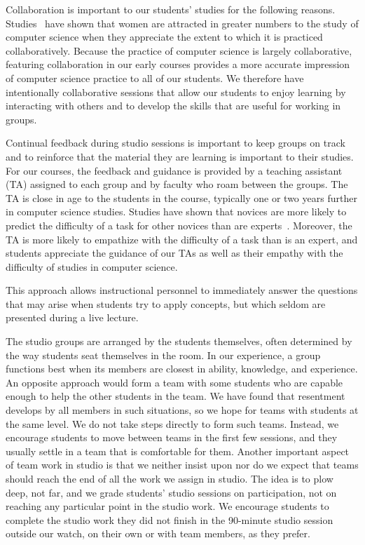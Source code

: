 Collaboration is important to our students' studies for the following reasons.
Studies~\cite{Krause:2012:EFL:2157136.2157192} have shown that women are
attracted in greater numbers to the study of computer science when they
appreciate the extent to which it is practiced collaboratively.  Because
the practice of computer science is largely collaborative, featuring collaboration
in our early courses provides a more accurate impression of computer science
practice to all of our students.  We therefore have intentionally collaborative
sessions that allow our students to enjoy learning by interacting with others
and to develop the skills that are useful for working in groups.

Continual feedback during studio sessions is important to keep groups on
track and to reinforce that the material they are learning is important to
their studies.  For our courses, the feedback and guidance is provided by
a teaching assistant (TA) assigned to each group and by faculty who
roam between the groups.  The TA is close in age to the students in the
course, typically one or two years further in computer science studies.
Studies have shown that novices are more likely to predict the difficulty
of a task for other novices than are experts~\cite{Hinds:1999}.  Moreover,
the TA is more likely to empathize with the difficulty of a task than is
an expert, and students appreciate the guidance of our TAs as well as their
empathy with the difficulty of studies in computer science.

This approach allows instructional personnel to immediately answer the questions that may arise when students try to apply concepts, but which seldom are presented during a live lecture.  

The studio groups are arranged by the students themselves, often determined
by the way students seat themselves in the room. In our experience, a group
functions best when its members are closest in ability, knowledge, and
experience.  An opposite approach would form a team with some students who
are capable enough to help the other students in the team.  We have found
that resentment develops by all members in such situations, so we hope for
teams with students at the same level.   We do not take steps directly to
form such teams.  Instead, we encourage students to move between teams in
the first few sessions, and they usually settle in a team that is comfortable
for them.  Another important aspect of team work in studio is that we neither
insist upon nor do we expect that teams should reach the end of all the work
we assign in studio.  The idea is to plow deep, not far, and we grade
students' studio sessions on participation,
not on reaching any particular point in the
studio work.  We encourage students to complete the studio work they did not
finish in the 90-minute studio session outside our watch,
on their own or with team members,
as they prefer.


